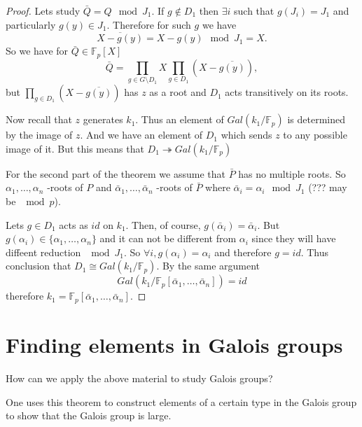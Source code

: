 \begin{theorem}
\begin{proof}
    Lets study $\bar{Q} = Q \mod J_1$. If $g \notin D_1$ then $\exists
    i$ such that $g\left(J_i\right) = J_1$ and particularly $g(y) \in
    J_1$. Therefore for such $g$ we have
    \[
    \overline{X -g\left(y\right)} = X -g\left(y\right) \mod J_1 = X. 
    \]
    So we have for $\bar{Q} \in \mathbb{F}_p\left[X\right]$
    \[
    \bar{Q} = \prod_{g \in G \setminus D_1} X \prod_{g \in D_1}
    \left(X - \overline{g\left(y\right)}\right),
    \]
    but
    \(
    \prod_{g \in D_1}
    \left(X - \overline{g\left(y\right)}\right)
    \) has $z$ as a root and $D_1$ acts transitively on its roots.

    Now recall that $z$ generates $k_1$. Thus an element of
    $Gal\left(k_1/\mathbb{F}_p\right)$ is determined by the image of
    $z$. And we have an element of $D_1$ which sends $z$ to any
    possible image of it. But this means that
    \(
    D_1 \twoheadrightarrow
    Gal\left(k_1/\mathbb{F}_p\right)
    \)

    For the second part of the theorem we assume that $\bar{P}$ has no
    multiple roots. So $\alpha_1, \dots, \alpha_n$ -roots of $P$ and
    $\bar{\alpha}_1, \dots, \bar{\alpha}_n$ -roots of $\bar{P}$ where
    $\bar{\alpha}_i = \alpha_i \mod J_1$ (??? may be $\mod p$).

    Lets $g \in D_1$ acts as $id$ on $k_1$. Then, of course,
    $g\left(\bar{\alpha}_i\right) = \bar{\alpha}_i$.
    But $g\left(\alpha_i\right) \in \{\alpha_1, \dots, \alpha_n\}$ and
    it can not be different from $\alpha_i$ since they will have
    diffeent reduction $\mod J_1$. So
    $\forall i,  g\left(\alpha_i\right) = \alpha_i$ and therefore $g =
    id$. Thus conclusion that $D_1 \cong
    Gal\left(k_1/\mathbb{F}_p\right)$. By the same argument
    \[
    Gal\left(k_1/\mathbb{F}_p\left[\bar{\alpha}_1,
      \dots, \bar{\alpha}_n\right]\right) = id
    \]
    therefore
    $k_1 = \mathbb{F}_p\left[\bar{\alpha}_1,
      \dots, \bar{\alpha}_n\right]$.
  \end{proof}
  \label{thm:lec9_2}
\end{theorem}

\section{Finding elements in Galois groups}
How can we apply the above material to study Galois groups?

One uses this theorem to construct elements of a certain type in the
Galois group to show that the Galois group is large.

